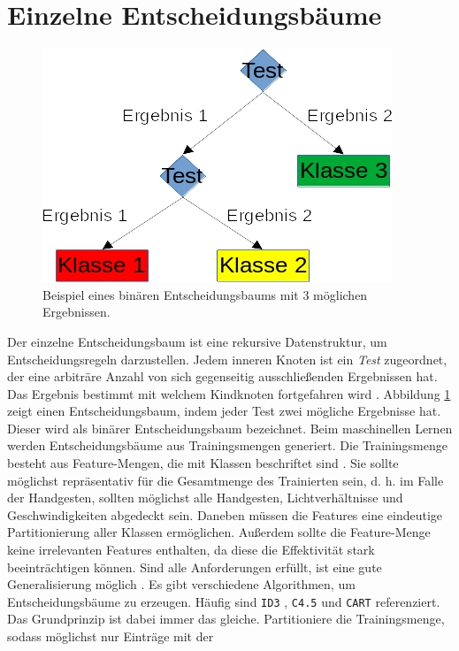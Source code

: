 \section{Einzelne Entscheidungsbäume}
\label{sec:construction}
\begin{figure}
    \centering
    \includegraphics[width=0.5\linewidth]{images/entscheidungsbaum.jpg}
    \caption{Beispiel eines binären Entscheidungsbaums mit 3 möglichen Ergebnissen.}
    \label{fig:entscheidungsbaum}
\end{figure}
Der einzelne Entscheidungsbaum ist eine rekursive Datenstruktur, um Entscheidungsregeln darzustellen. Jedem inneren Knoten ist ein \textit{Test} zugeordnet, der eine arbiträre Anzahl von sich gegenseitig
ausschließenden Ergebnissen hat. Das Ergebnis bestimmt mit welchem Kindknoten fortgefahren wird \cite{quinlan1990decision}. Abbildung \ref{fig:entscheidungsbaum} zeigt einen Entscheidungsbaum, indem jeder Test
zwei mögliche Ergebnisse hat. Dieser wird als binärer Entscheidungsbaum bezeichnet.
\newline
\newline
Beim maschinellen Lernen werden Entscheidungsbäume aus Trainingsmengen generiert. Die Trainingsmenge besteht aus Feature-Mengen, die mit Klassen beschriftet sind \cite{steinbergCART}. Sie sollte möglichst repräsentativ
für die Gesamtmenge des Trainierten sein, d. h. im Falle der Handgesten, sollten möglichst alle Handgesten, Lichtverhältnisse und Geschwindigkeiten abgedeckt sein. Daneben müssen die Features eine eindeutige
Partitionierung aller Klassen ermöglichen. Außerdem sollte die Feature-Menge keine irrelevanten Features enthalten, da diese die Effektivität stark beeinträchtigen können. Sind alle Anforderungen erfüllt, ist eine
gute Generalisierung möglich \cite{pei1998feature}.
\newline
\newline
Es gibt verschiedene Algorithmen, um Entscheidungsbäume zu erzeugen. Häufig sind \texttt{ID3} \cite{quinlan1986induction}, \texttt{C4.5} \cite{quinlan2014c4}
und \texttt{CART} \cite{breiman1984classification} referenziert. Das Grundprinzip ist dabei immer das gleiche. Partitioniere die Trainingsmenge, sodass möglichst nur Einträge mit der
